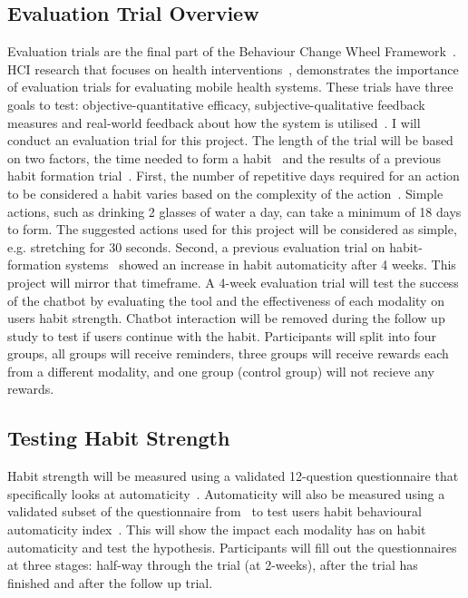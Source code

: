 \subsection{Evaluation Trial Overview}
Evaluation trials are the final part of the Behaviour Change Wheel Framework~\cite{article_behaviour_change_wheel}.
HCI research that focuses on health interventions~\cite{article_mhealth}, demonstrates the importance of evaluation trials for evaluating mobile health systems.
These trials have three goals to test: objective-quantitative efficacy, subjective-qualitative feedback measures and real-world feedback about how the system is
utilised~\cite{article_evaluate_tech_health_behaviour_change}. I will conduct an evaluation trial for this project.\newline
\newline
The length of the trial will be based on two factors, the time needed to form a habit~\cite{article_how_habits_formed_modelling_habit_formation} and the results of a previous
habit formation trial~\cite{article_beyond_self_tracking_designing_apps}.
First, the number of repetitive days required for an action to be considered a habit varies based on the complexity of the action~\cite{article_how_habits_formed_modelling_habit_formation}.
Simple actions, such as drinking 2 glasses of water a day, can take a minimum of 18 days to form.
The suggested actions used for this project will be considered as simple, e.g. stretching for 30 seconds.
Second, a previous evaluation trial on habit-formation systems~\cite{article_how_habits_formed_modelling_habit_formation} showed an increase in habit automaticity after 4 weeks.
This project will mirror that timeframe.\newline
\newline
A 4-week evaluation trial will test the success of the chatbot by evaluating the tool and the effectiveness of each modality on users habit strength.
Chatbot interaction will be removed during the follow up study to test if users continue with the habit.
Participants will split into four groups, all groups will receive reminders, three groups will receive rewards each from a different modality,
and one group (control group) will not recieve any rewards.

\subsection{Testing Habit Strength}
Habit strength will be measured using a validated 12-question questionnaire that specifically looks at automaticity~\cite{article_habit_strength}.
Automaticity will also be measured using a validated subset of the questionnaire from~\cite{article_habit_strength} to test users habit behavioural
automaticity index~\cite{article_habit_measurement}. This will show the impact each modality has on habit automaticity and test the hypothesis.
Participants will fill out the questionnaires~\cite{article_habit_strength, article_habit_measurement} at three stages: half-way through the trial (at 2-weeks),
after the trial has finished and after the follow up trial.

